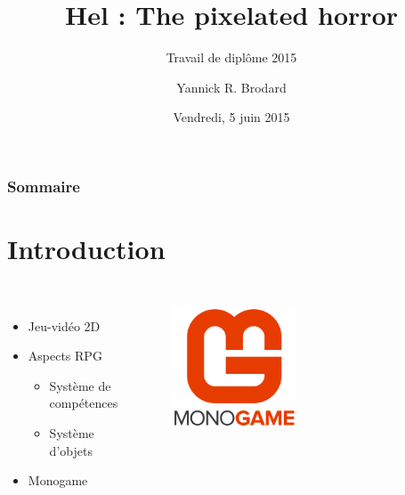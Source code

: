\documentclass{beamer}
\title[Hel : The pixelated horror]{Hel : The pixelated horror}
\subtitle{Travail de diplôme 2015}
\author{Yannick R. Brodard}
\institute{Centre de Formation Professionnelle Technique\\École d'informatique}
\date{Vendredi, 5 juin 2015}
\begin{document}
\frame{\titlepage}

\begin{frame}
\frametitle{Sommaire}
\tableofcontents[hideallsubsections]
\end{frame}


\section{Introduction}
\subsection{}
\begin{frame}
\begin{columns}
	\begin{itemize}
		\item Jeu-vidéo 2D
		\item Aspects RPG
		\begin{itemize}
			\item Système de compétences
			\item Système d'objets
		\end{itemize}
		\item Monogame
	\end{itemize}
\begin{figure}
\includegraphics[width=0.5\textwidth]{img/pres_monogame_logo.png}
\end{figure}
\end{columns}
\end{frame}
\end{document}
